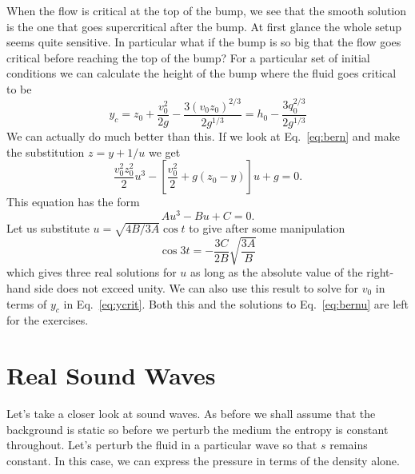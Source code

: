 {When the flow is critical at the top of the bump, we see that the
smooth solution is the one that goes supercritical after the bump.  At
first glance the whole setup seems quite sensitive.  In particular
what if the bump is so big that the flow goes critical before reaching
the top of the bump?  For a particular set of initial conditions we
can calculate the height of the bump where the fluid goes
critical to be
\begin{equation}
y_c = z_0 + \frac{v_0^2}{2g} - \frac{3 \left (v_0 z_0\right)^{2/3}}{2
  g^{1/3}} = h_0 - \frac{3 q_0^{2/3}}{2 g^{1/3}}
\label{eq:ycrit}
\label{eq:674}
\end{equation}
We can actually do much better than this.  If we look at
Eq.~\ref{eq:bern} and make the substitution $z=y+1/u$ we get
\begin{equation}
\frac{v_0^2 z_0^2}{2} u^3 - \left [ \frac{v_0^2}{2} + g \left ( z_0 -
    y \right )   \right ] u + g = 0.
\label{eq:bernu}
\label{eq:675}
\end{equation}
This equation has the form
\begin{equation}
A u^3 - B u + C = 0.
\label{eq:cubic}
\label{eq:676}
\end{equation}
Let us substitute $u=\sqrt{4B/3A} \cos t$ to give after some
manipulation
\begin{equation}
\cos 3 t = -\frac{3 C}{2 B} \sqrt{\frac{3A}{B}}
\label{eq:cubic_sol}
\label{eq:677}
\end{equation}
which gives three real solutions for $u$ as long as the absolute value
of the right-hand side does not exceed unity.
We can also use this result to solve for $v_0$ in terms of $y_c$ in
Eq.~\ref{eq:ycrit}.   Both this and the solutions to
Eq.~\ref{eq:bernu} are left for the exercises.


\section{Real Sound Waves}
\label{sec:real-sound-waves}
Let's take a closer look at sound waves.  As before we shall assume
that the background is static so before we perturb the medium the
entropy is constant throughout.  Let's perturb the fluid in a
particular wave so that $s$ remains constant.  In this case, we can
express the pressure in terms of the density alone.

}
